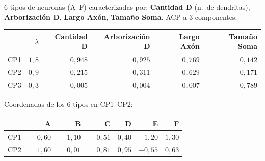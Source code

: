 \documentclass[11pt,a4paper]{article}
\begin{document}
\begin{enuncbox}
6 tipos de neuronas (A--F) caracterizadas por: \textbf{Cantidad D} (n.\ de dendritas), \textbf{Arborización D}, \textbf{Largo Axón}, \textbf{Tamaño Soma}. ACP a 3 componentes:

\begin{center}\small
\begin{tabular}{lrrrrr}\toprule
 & $\lambda$ & Cantidad D & Arborización D & Largo Axón & Tamaño Soma\\\midrule
CP1 & $1{,}8$ & $\phantom{-}0{,}948$ & $\phantom{-}0{,}925$ & $\phantom{-}0{,}769$ & $\phantom{-}0{,}142$\\
CP2 & $0{,}9$ & $-0{,}215$ & $\phantom{-}0{,}311$ & $\phantom{-}0{,}629$ & $-0{,}171$\\
CP3 & $0{,}3$ & $\phantom{-}0{,}005$ & $-0{,}004$ & $-0{,}007$ & $\phantom{-}0{,}789$\\\bottomrule
\end{tabular}\end{center}

Coordenadas de los 6 tipos en CP1--CP2:

\begin{center}\small
\begin{tabular}{lrrrrrr}\toprule
 & A & B & C & D & E & F\\\midrule
CP1 & $-0{,}60$ & $-1{,}10$ & $-0{,}51$ & $0{,}40$ & $1{,}20$ & $1{,}30$\\
CP2 & $\phantom{-}1{,}60$ & $\phantom{-}0{,}01$ & $\phantom{-}0{,}81$ & $0{,}95$ & $-0{,}55$ & $0{,}63$\\\bottomrule
\end{tabular}\end{center}
\end{enuncbox}
\end{document}
